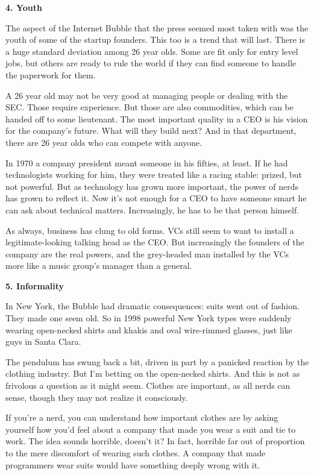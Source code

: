 \documentclass[12pt]{book}
\begin{document}
\textbf{4. Youth}

The aspect of the Internet Bubble that the press seemed most taken with
was the youth of some of the startup founders. This too is a trend that
will last. There is a huge standard deviation among 26 year olds. Some
are fit only for entry level jobs, but others are ready to rule the
world if they can find someone to handle the paperwork for them.

A 26 year old may not be very good at managing people or dealing with
the SEC. Those require experience. But those are also commodities, which
can be handed off to some lieutenant. The most important quality in a
CEO is his vision for the company's future. What will they build next?
And in that department, there are 26 year olds who can compete with
anyone.

In 1970 a company president meant someone in his fifties, at least. If
he had technologists working for him, they were treated like a racing
stable: prized, but not powerful. But as technology has grown more
important, the power of nerds has grown to reflect it. Now it's not
enough for a CEO to have someone smart he can ask about technical
matters. Increasingly, he has to be that person himself.

As always, business has clung to old forms. VCs still seem to want to
install a legitimate-looking talking head as the CEO. But increasingly
the founders of the company are the real powers, and the grey-headed man
installed by the VCs more like a music group's manager than a general.

\textbf{5. Informality}

In New York, the Bubble had dramatic consequences: suits went out of
fashion. They made one seem old. So in 1998 powerful New York types were
suddenly wearing open-necked shirts and khakis and oval wire-rimmed
glasses, just like guys in Santa Clara.

The pendulum has swung back a bit, driven in part by a panicked reaction
by the clothing industry. But I'm betting on the open-necked shirts. And
this is not as frivolous a question as it might seem. Clothes are
important, as all nerds can sense, though they may not realize it
consciously.

If you're a nerd, you can understand how important clothes are by asking
yourself how you'd feel about a company that made you wear a suit and
tie to work. The idea sounds horrible, doesn't it? In fact, horrible far
out of proportion to the mere discomfort of wearing such clothes. A
company that made programmers wear suits would have something deeply
wrong with it.
\end{document}
